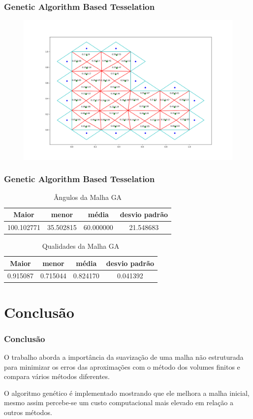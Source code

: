 \documentclass{beamer}
\begin{document}
\begin{frame}
  \frametitle{Genetic Algorithm Based Tesselation}

  \begin{figure}
    \includegraphics[width=0.6\linewidth]{malha-ga.png}
  \end{figure}

\end{frame}
\begin{frame}
  \frametitle{Genetic Algorithm Based Tesselation}
  \begin{table}[hb]
    \centering
    \par\caption{Ângulos da Malha GA}
    \begin{tabular}{c|c|c|c}
      Maior      & menor     & média     & desvio padrão \\\hline\hline
      100.102771 & 35.502815 & 60.000000 & 21.548683     \\\hline
    \end{tabular}
    \label{tab:angulos-malha-ga}
  \end{table}

  \begin{table}[hb]
    \centering
    \par\caption{Qualidades da Malha GA}
    \begin{tabular}{c|c|c|c}
      Maior    & menor    & média    & desvio padrão \\\hline\hline
      0.915087 & 0.715044 & 0.824170 & 0.041392      \\\hline
    \end{tabular}
    \label{tab:qualidades-malha-ga}
  \end{table}
\end{frame}

\section{Conclusão}
\begin{frame}
  \frametitle{Conclusão}
  O trabalho aborda a importância da suavização de uma malha não estruturada para minimizar os erros das aproximações com o método dos volumes finitos e compara vários métodos diferentes.

  O algoritmo genético é implementado mostrando que ele melhora a malha inicial, mesmo assim percebe-se um custo computacional mais elevado em relação a outros métodos.
\end{frame}
\end{document}
